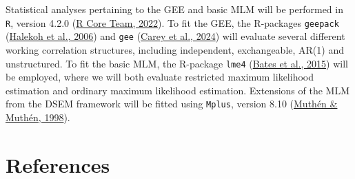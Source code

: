 \documentclass[
  12pt,
  a4paper,
]{article}
\begin{document}
Statistical analyses pertaining to the GEE and basic MLM will be
performed in \texttt{R}, version 4.2.0
(\protect\hyperlink{ref-rcoreteam2022}{R Core Team, 2022}). To fit the
GEE, the R-packages \texttt{geepack}
(\protect\hyperlink{ref-halekoh2006}{Halekoh et al., 2006}) and
\texttt{gee} (\protect\hyperlink{ref-carey2024}{Carey et al., 2024})
will evaluate several different working correlation structures,
including independent, exchangeable, AR(1) and unstructured. To fit the
basic MLM, the R-package \texttt{lme4}
(\protect\hyperlink{ref-bates2015}{Bates et al., 2015}) will be
employed, where we will both evaluate restricted maximum likelihood
estimation and ordinary maximum likelihood estimation. Extensions of the
MLM from the DSEM framework will be fitted using \texttt{Mplus}, version
8.10 (\protect\hyperlink{ref-muthuxe9n1998}{Muthén \& Muthén, 1998}).

\newpage

\hypertarget{references}{%
\section{References}\label{references}}
\end{document}
